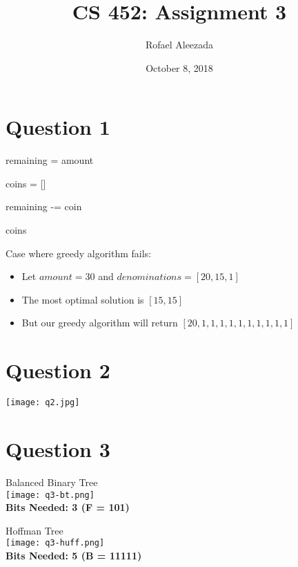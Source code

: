 \documentclass{article}
\title{CS 452: Assignment 3}
\date{October 8, 2018}
\author{Rofael Aleezada}
\begin{document}
	\maketitle
	
	\section{Question 1}
	\begin{algorithmic}
			
			
			remaining = amount
			
			coins = []
			
					\State {}
				\EndIf
						\State {} 
						\State remaining -= coin
					\EndIf
				\EndFor
			\EndWhile
			
			\Return coins
		\EndFunction
	\end{algorithmic}

	Case where greedy algorithm fails:
	\begin{itemize}
		\item Let $amount = 30$ and $denominations = [20, 15, 1]$
		\item The most optimal solution is $[15, 15]$
		\item But our greedy algorithm will return $[20, 1, 1, 1, 1, 1, 1, 1, 1, 1, 1]$
	\end{itemize}

	\section{Question 2}
	\texttt{[image: q2.jpg]}
	\pagebreak
	
	\section{Question 3}
	\begin{center}
		Balanced Binary Tree \\ 
		\texttt{[image: q3-bt.png]} \\
		\textbf{Bits Needed: 3 (F = 101)}
	\end{center}
	\begin{center}
		Hoffman Tree \\
		\texttt{[image: q3-huff.png]} \\
		\textbf{Bits Needed: 5 (B = 11111)}
	\end{center}
	\pagebreak
	
\end{document}
